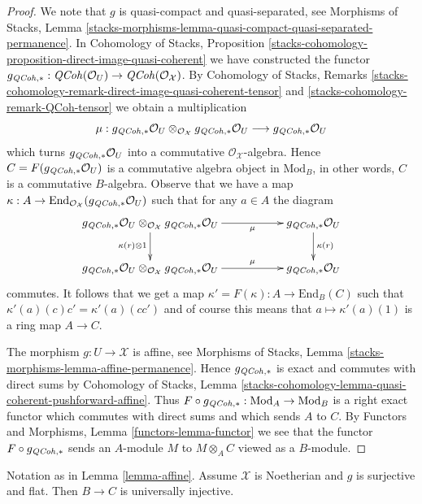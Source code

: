 \begin{proof}
We note that $g$ is quasi-compact and quasi-separated, see
Morphisms of Stacks, Lemma
\ref{stacks-morphisms-lemma-quasi-compact-quasi-separated-permanence}.
In Cohomology of Stacks, Proposition
\ref{stacks-cohomology-proposition-direct-image-quasi-coherent}
we have constructed the functor
$g_{\mathit{QCoh}, *} : \mathit{QCoh}(\mathcal{O}_U) \to \mathit{QCoh}(\mathcal{O}_\mathcal{X})$.
By Cohomology of Stacks, Remarks
\ref{stacks-cohomology-remark-direct-image-quasi-coherent-tensor} and
\ref{stacks-cohomology-remark-QCoh-tensor}
we obtain a multiplication
$$
\mu :
g_{\mathit{QCoh}, *}\mathcal{O}_U
\otimes_{\mathcal{O}_\mathcal{X}}
g_{\mathit{QCoh}, *}\mathcal{O}_U
\longrightarrow
g_{\mathit{QCoh}, *}\mathcal{O}_U
$$
which turns $g_{\mathit{QCoh}, *}\mathcal{O}_U$ into a commutative
$\mathcal{O}_\mathcal{X}$-algebra. Hence $C = F(g_{\mathit{QCoh}, *}\mathcal{O}_U)$
is a commutative algebra object in $\text{Mod}_B$, in other words, $C$ is a
commutative $B$-algebra. Observe that we have a map
$\kappa : A \to \text{End}_{\mathcal{O}_\mathcal{X}}(g_{\mathit{QCoh}, *}\mathcal{O}_U)$
such that for any $a \in A$ the diagram
$$
\xymatrix{
g_{\QCoh, *}\mathcal{O}_U \otimes_{\mathcal{O}_\mathcal{X}}
g_{\QCoh, *}\mathcal{O}_U
\ar[d]_{\kappa(r) \otimes 1} \ar[rr]_-\mu & &
g_{\QCoh, *}\mathcal{O}_U \ar[d]^{\kappa(r)} \\
g_{\QCoh, *}\mathcal{O}_U \otimes_{\mathcal{O}_\mathcal{X}}
g_{\QCoh, *}\mathcal{O}_U
\ar[rr]^-\mu & &
g_{\QCoh, *}\mathcal{O}_U
}
$$
commutes. It follows that we get a map
$\kappa' = F(\kappa) : A \to \text{End}_B(C)$
such that $\kappa'(a)(c) c' = \kappa'(a)(cc')$ and of course this means that
$a \mapsto \kappa'(a)(1)$ is a ring map $A \to C$.

\medskip\noindent
The morphism $g : U \to \mathcal{X}$ is affine, see
Morphisms of Stacks, Lemma \ref{stacks-morphisms-lemma-affine-permanence}.
Hence $g_{\mathit{QCoh}, *}$ is exact and commutes with direct sums by
Cohomology of Stacks, Lemma
\ref{stacks-cohomology-lemma-quasi-coherent-pushforward-affine}.
Thus $F \circ g_{\mathit{QCoh}, *} : \text{Mod}_A \to \text{Mod}_B$
is a right exact functor which commutes with direct sums
and which sends $A$ to $C$.
By Functors and Morphisms, Lemma \ref{functors-lemma-functor}
we see that the functor $F \circ g_{\mathit{QCoh}, *}$ sends an $A$-module
$M$ to $M \otimes_A C$ viewed as a $B$-module.
\end{proof}

\begin{lemma}
\label{lemma-universally-injective}
Notation as in Lemma \ref{lemma-affine}. Assume $\mathcal{X}$ is
Noetherian and $g$ is surjective and flat.
Then $B \to C$ is universally injective.
\end{lemma}

